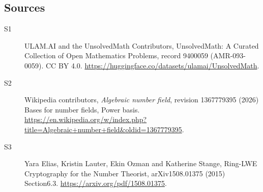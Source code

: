 \documentclass[11pt]{article}
\begin{document}
\subsection{Sources}
\begin{description}
\item[\hypertarget{source:9400059:1}{S1}] ULAM.AI and the UnsolvedMath Contributors, UnsolvedMath: A Curated Collection of Open Mathematics Problems, record 9400059 (AMR-093-0059). CC BY 4.0. \url{https://huggingface.co/datasets/ulamai/UnsolvedMath}.
\item[\hypertarget{source:9400059:2}{S2}] Wikipedia contributors, \emph{Algebraic number field}, revision 1367779395 (2026) Bases for number fields, Power basis. \url{https://en.wikipedia.org/w/index.php?title=Algebraic+number+field&oldid=1367779395}.
\item[\hypertarget{source:9400059:3}{S3}] Yara Elias, Kristin Lauter, Ekin Ozman and Katherine Stange, Ring-LWE Cryptography for the Number Theorist, arXiv1508.01375 (2015) Section6.3. \url{https://arxiv.org/pdf/1508.01375}.
\end{description}
\label{end:9400059}
\end{document}
